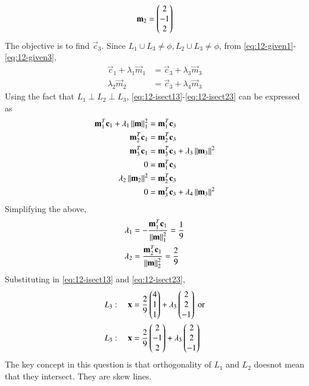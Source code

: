 \begin{enumerate}[label=\arabic*.,ref=\thesubsection.\theenumi]
\begin{align}
\mathbf{m}_2 = \begin{pmatrix}2 \\-1 \\ 2\end{pmatrix}
\end{align}
The objective is to find $\vec{c}_3$.  Since $L_1 \cup L_3 \ne \phi, L_2 \cup L_3 \ne \phi$, from \eqref{eq:12-given1}-\eqref{eq:12-given3},
\begin{align}
\label{eq:12-isect13}
\vec{c}_1 + \lambda_1 \vec{m}_1 &= \vec{c}_3 + \lambda_3 \vec{m}_3
\\
  \lambda_2 \vec{m}_2 &= \vec{c}_3 + \lambda_4 \vec{m}_3
\label{eq:12-isect23}
\end{align}
%
Using the fact that $L_1\perp L_2\perp L_3$, \eqref{eq:12-isect13}-\eqref{eq:12-isect23} can be expressed as
\begin{align}
\mathbf{m}_1^T\mathbf{c}_1 + \lambda_1 \left\lVert\mathbf{m}\right\rVert_1^2 &= \mathbf{m}_1^T\mathbf{c}_3 
\\
\mathbf{m}_2^T\mathbf{c}_1  &= \mathbf{m}_2^T\mathbf{c}_3 
\\
\mathbf{m}_3^T\mathbf{c}_1  &= \mathbf{m}_3^T\mathbf{c}_3 + \lambda_3 \left\lVert\mathbf{m}_3\right\rVert^2
\\
0 &= \mathbf{m}_1^T\mathbf{c}_3 
\\
  \lambda_2 \left\lVert\mathbf{m}_2\right\rVert^2 &= \mathbf{m}_2^T\mathbf{c}_3 
\\
0 &= \mathbf{m}_3^T\mathbf{c}_3  + \lambda_4 \left\lVert\mathbf{m}_3\right\rVert^2
\end{align}
%
Simplifying the above, 
\begin{align}
 \lambda_1  &= -\frac{\mathbf{m}_1^T\mathbf{c}_1}{\left\lVert\mathbf{m}\right\rVert_1^2} = \frac{1}{9}
\\
 \lambda_2  &= \frac{\mathbf{m}_2^T\mathbf{c}_1}{\left\lVert\mathbf{m}\right\rVert_2^2} =\frac{2}{9}
\end{align}
%
Substituting in \eqref{eq:12-isect13} and \eqref{eq:12-isect23},
\begin{align}
L_3: \quad \mathbf{x} &= \frac{2}{9}\begin{pmatrix}4 \\ 1 \\ 1\end{pmatrix} + \lambda_3\begin{pmatrix}2 \\ 2 \\ -1\end{pmatrix} \text{ or}
\\
L_3: \quad \mathbf{x} &= \frac{2}{9}\begin{pmatrix}2 \\-1 \\ 2\end{pmatrix} + \lambda_3\begin{pmatrix}2 \\ 2 \\ -1\end{pmatrix}
\end{align}
%
The key concept in this question is that orthogonality of $L_1$ and $L_2$ doesnot mean that they intersect.  They are skew lines.
\end{enumerate}
%


